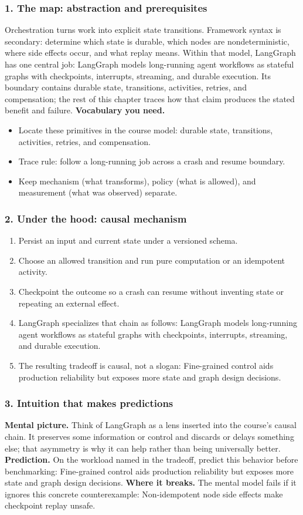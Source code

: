 \subsubsection*{1. The map: abstraction and prerequisites}
Orchestration turns work into explicit state transitions. Framework syntax is secondary: determine which state is durable, which nodes are nondeterministic, where side effects occur, and what replay means.
Within that model, LangGraph has one central job: LangGraph models long-running agent workflows as stateful graphs with checkpoints, interrupts, streaming, and durable execution. Its boundary contains durable state, transitions, activities, retries, and compensation; the rest of this chapter traces how that claim produces the stated benefit and failure.
\textbf{Vocabulary you need.}\begin{itemize}
\item Locate these primitives in the course model: durable state, transitions, activities, retries, and compensation.
\item Trace rule: follow a long-running job across a crash and resume boundary.
\item Keep mechanism (what transforms), policy (what is allowed), and measurement (what was observed) separate.
\end{itemize}
\subsubsection*{2. Under the hood: causal mechanism}\begin{enumerate}
\item Persist an input and current state under a versioned schema.
\item Choose an allowed transition and run pure computation or an idempotent activity.
\item Checkpoint the outcome so a crash can resume without inventing state or repeating an external effect.
\item LangGraph specializes that chain as follows: LangGraph models long-running agent workflows as stateful graphs with checkpoints, interrupts, streaming, and durable execution.
\item The resulting tradeoff is causal, not a slogan: Fine-grained control aids production reliability but exposes more state and graph design decisions.
\end{enumerate}
\subsubsection*{3. Intuition that makes predictions}
\textbf{Mental picture.} Think of LangGraph as a lens inserted into the course's causal chain. It preserves some information or control and discards or delays something else; that asymmetry is why it can help rather than being universally better.
\textbf{Prediction.} On the workload named in the tradeoff, predict this behavior before benchmarking: Fine-grained control aids production reliability but exposes more state and graph design decisions.
\textbf{Where it breaks.} The mental model fails if it ignores this concrete counterexample: Non-idempotent node side effects make checkpoint replay unsafe.
